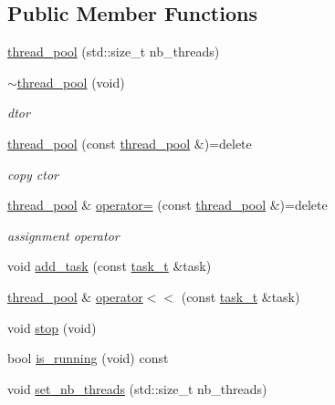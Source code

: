 \subsection*{Public Member Functions}
\begin{DoxyCompactItemize}
\item 
\hyperlink{classtacopie_1_1utils_1_1thread__pool_aa0068f000b8ecb21b2b0a0c50f77877c}{thread\+\_\+pool} (std\+::size\+\_\+t nb\+\_\+threads)
\item 
\hyperlink{classtacopie_1_1utils_1_1thread__pool_accddfc6fad613b0c6d407028799abfc5}{$\sim$thread\+\_\+pool} (void)
\begin{DoxyCompactList}\small\item\em dtor \end{DoxyCompactList}\item 
\hyperlink{classtacopie_1_1utils_1_1thread__pool_a63a850c39d21058eda9d655bb7eff452}{thread\+\_\+pool} (const \hyperlink{classtacopie_1_1utils_1_1thread__pool}{thread\+\_\+pool} \&)=delete
\begin{DoxyCompactList}\small\item\em copy ctor \end{DoxyCompactList}\item 
\hyperlink{classtacopie_1_1utils_1_1thread__pool}{thread\+\_\+pool} \& \hyperlink{classtacopie_1_1utils_1_1thread__pool_aa0077461da4da6ba3f4dcac029351234}{operator=} (const \hyperlink{classtacopie_1_1utils_1_1thread__pool}{thread\+\_\+pool} \&)=delete
\begin{DoxyCompactList}\small\item\em assignment operator \end{DoxyCompactList}\item 
void \hyperlink{classtacopie_1_1utils_1_1thread__pool_a450bee2b7b2cd0aa0bc3935c8adc9ace}{add\+\_\+task} (const \hyperlink{classtacopie_1_1utils_1_1thread__pool_a8ae8886fdeaa8e5c0abad12626a47296}{task\+\_\+t} \&task)
\item 
\hyperlink{classtacopie_1_1utils_1_1thread__pool}{thread\+\_\+pool} \& \hyperlink{classtacopie_1_1utils_1_1thread__pool_afb7befd9fa5f1fbd44423fddc8cbc5d3}{operator$<$$<$} (const \hyperlink{classtacopie_1_1utils_1_1thread__pool_a8ae8886fdeaa8e5c0abad12626a47296}{task\+\_\+t} \&task)
\item 
void \hyperlink{classtacopie_1_1utils_1_1thread__pool_a8874d7040d12fbe446519bc9f2bcff37}{stop} (void)
\item 
bool \hyperlink{classtacopie_1_1utils_1_1thread__pool_a77a647a75be188a5c5f83b922c061107}{is\+\_\+running} (void) const
\item 
void \hyperlink{classtacopie_1_1utils_1_1thread__pool_a7c7ae922cedff8fa323828ebb6dea829}{set\+\_\+nb\+\_\+threads} (std\+::size\+\_\+t nb\+\_\+threads)
\end{DoxyCompactItemize}
